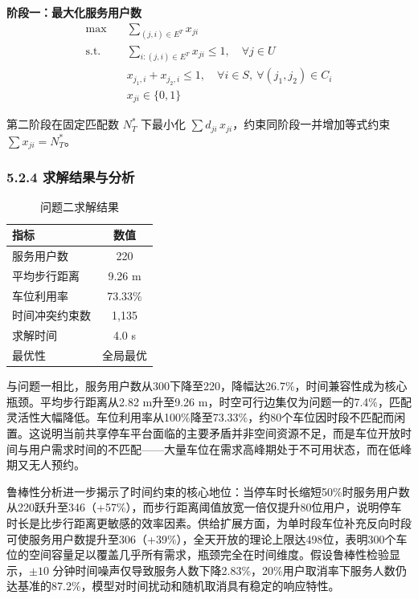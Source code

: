 \documentclass{ctexart}
\begin{document}
\textbf{阶段一：最大化服务用户数}
\begin{equation}
  \begin{aligned}
    \max\quad        & \sum_{(j,i)\in E^T} x_{ji}                                                  \\
    \text{s.t.}\quad & \sum_{i:(j,i)\in E^T} x_{ji} \le 1,\quad \forall j\in U                     \\
                     & x_{j_1,i} + x_{j_2,i} \le 1,\quad \forall i\in S,\ \forall (j_1,j_2)\in C_i \\
                     & x_{ji}\in\{0,1\}
  \end{aligned}\label{eq:q2_p1}
\end{equation}

第二阶段在固定匹配数 $N_T^*$ 下最小化 $\sum d_{ji}\,x_{ji}$，约束同阶段一并增加等式约束 $\sum x_{ji} = N_T^*$。

\subsubsection*{5.2.4 求解结果与分析}

\begin{table}[H]
  \centering
  \caption{问题二求解结果}
  \label{tab:q2_result}
  \begin{tabular}{lc}
    \toprule
    指标      & 数值      \\
    \midrule
    服务用户数   & 220     \\
    平均步行距离  & 9.26 m  \\
    车位利用率   & 73.33\% \\
    时间冲突约束数 & 1,135   \\
    求解时间    & 4.0 s   \\
    最优性     & 全局最优    \\
    \bottomrule
  \end{tabular}
\end{table}

与问题一相比，服务用户数从300下降至220，降幅达26.7\%，时间兼容性成为核心瓶颈。平均步行距离从2.82 m升至9.26 m，时空可行边集仅为问题一的7.4\%，匹配灵活性大幅降低。车位利用率从100\%降至73.33\%，约80个车位因时段不匹配而闲置。这说明当前共享停车平台面临的主要矛盾并非空间资源不足，而是车位开放时间与用户需求时间的不匹配——大量车位在需求高峰期处于不可用状态，而在低峰期又无人预约。

鲁棒性分析进一步揭示了时间约束的核心地位：当停车时长缩短50\%时服务用户数从220跃升至346（+57\%），而步行距离阈值放宽一倍仅提升80位用户，说明停车时长是比步行距离更敏感的效率因素。供给扩展方面，为单时段车位补充反向时段可使服务用户数提升至306（+39\%），全天开放的理论上限达498位，表明300个车位的空间容量足以覆盖几乎所有需求，瓶颈完全在时间维度。假设鲁棒性检验显示，$\pm10$ 分钟时间噪声仅导致服务人数下降2.83\%，20\%用户取消率下服务人数仍达基准的87.2\%，模型对时间扰动和随机取消具有稳定的响应特性。
\end{document}
